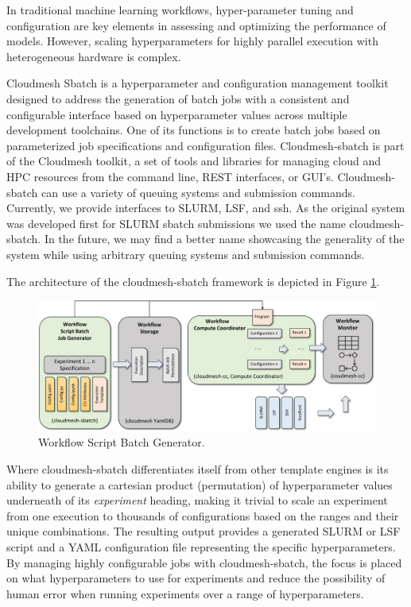 \documentclass[utf8]{FrontiersinVancouver} %
\begin{document}
In traditional machine learning workflows, hyper-parameter tuning and
configuration are key elements in assessing and optimizing the
performance of models. However, scaling hyperparameters for highly
parallel execution with heterogeneous hardware is complex.

Cloudmesh Sbatch is a hyperparameter and configuration management
toolkit designed to address the generation of batch jobs with a
consistent and configurable interface based on hyperparameter values
across multiple development toolchains. One of its functions is to
create batch jobs based on parameterized job specifications and
configuration files.  Cloudmesh-sbatch is part of the Cloudmesh
toolkit, a set of tools and libraries for managing cloud and HPC
resources from the command line, REST interfaces, or GUI's.
Cloudmesh-sbatch can use a variety of
queuing systems and submission commands. Currently, we provide
interfaces to SLURM, LSF, and ssh. As the original system was
developed first for SLURM sbatch submissions we used the name
cloudmesh-sbatch. In the future, we may find a better name showcasing the
generality of the system while using arbitrary queuing systems and
submission commands.

The architecture of the cloudmesh-sbatch framework is depicted in
Figure \ref{fig:cm-sbatch}.

\begin{figure}[htb]
    \centering
    \includegraphics[width=1.0\columnwidth]{images/cloudmesh-sbatch-new.pdf}
    \caption{Workflow Script Batch Generator.}
    \label{fig:cm-sbatch}
\end{figure}


Where cloudmesh-sbatch differentiates itself from other template engines is its
ability to generate a cartesian product  (permutation) of hyperparameter values
underneath of its {\it experiment} heading, making it trivial to
scale an experiment from one execution to thousands of configurations
based on the ranges and their unique combinations.  The resulting
output provides a generated SLURM or LSF script and a YAML
configuration file representing the specific hyperparameters.  By
managing highly configurable jobs with cloudmesh-sbatch, the focus is
placed on what hyperparameters to use for experiments and reduce the
possibility of human error when running experiments over a range of
hyperparameters.
\end{document}
